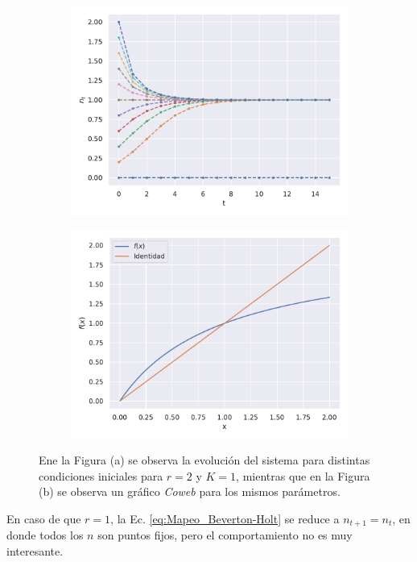 \begin{figure}
    \centering
    \begin{subfigure}[b]{0.49\textwidth}
        \includegraphics[width=\textwidth, height=0.8\textwidth]{Mapeo_r=2.pdf}
        \caption{}
        \label{01_Simulacion}
    \end{subfigure}
    \hfill
    \begin{subfigure}[b]{0.49\textwidth}
        \includegraphics[width=\textwidth, height=0.8\textwidth]{Coweb_r=2.pdf}
        \caption{}
        \label{01_Coweb}
    \end{subfigure}
    \caption{Ene  la Figura (a) se observa la evolución del sistema para distintas condiciones iniciales para $r=2$ y $K=1$, mientras que en la Figura (b) se observa un gráfico \textit{Coweb} para los mismos parámetros.}
    \label{PONER_LABEL}
\end{figure}


En caso de que $r=1$, la Ec. \ref{eq:Mapeo_Beverton-Holt} se reduce a $n_{t+1} = n_t$, en donde todos los $n$ son puntos fijos, pero el comportamiento no es muy interesante.